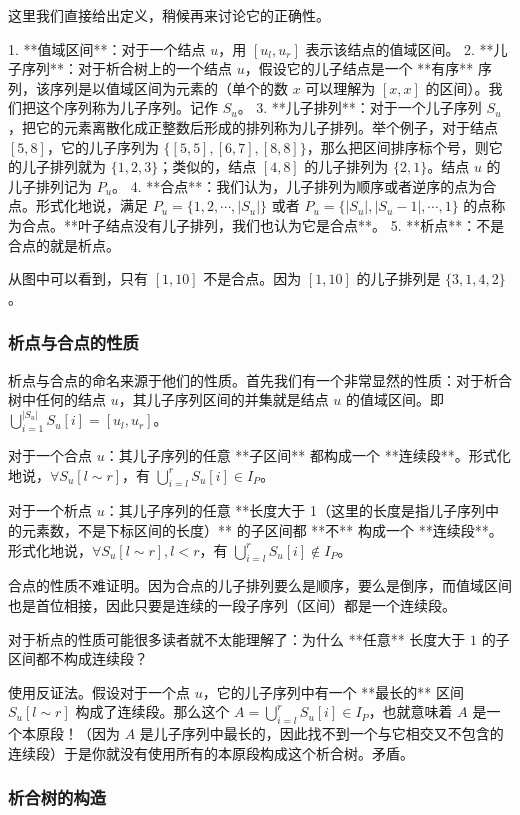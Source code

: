 \documentclass{ctexart}
\begin{document}
这里我们直接给出定义，稍候再来讨论它的正确性。

1. **值域区间**：对于一个结点 $u$，用 $[u_l,u_r]$ 表示该结点的值域区间。
2. **儿子序列**：对于析合树上的一个结点 $u$，假设它的儿子结点是一个 **有序** 序列，该序列是以值域区间为元素的（单个的数 $x$ 可以理解为 $[x,x]$ 的区间）。我们把这个序列称为儿子序列。记作 $S_u$。
3. **儿子排列**：对于一个儿子序列 $S_u$，把它的元素离散化成正整数后形成的排列称为儿子排列。举个例子，对于结点 $[5,8]$，它的儿子序列为 $\{[5,5],[6,7],[8,8]\}$，那么把区间排序标个号，则它的儿子排列就为 $\{1,2,3\}$；类似的，结点 $[4,8]$ 的儿子排列为 $\{2,1\}$。结点 $u$ 的儿子排列记为 $P_u$。
4. **合点**：我们认为，儿子排列为顺序或者逆序的点为合点。形式化地说，满足 $P_u=\{1,2,\cdots,|S_u|\}$ 或者 $P_u=\{|S_u|,|S_u-1|,\cdots,1\}$ 的点称为合点。**叶子结点没有儿子排列，我们也认为它是合点**。
5. **析点**：不是合点的就是析点。

从图中可以看到，只有 $[1,10]$ 不是合点。因为 $[1,10]$ 的儿子排列是 $\{3,1,4,2\}$。

\subsubsection{析点与合点的性质}

析点与合点的命名来源于他们的性质。首先我们有一个非常显然的性质：对于析合树中任何的结点 $u$，其儿子序列区间的并集就是结点 $u$ 的值域区间。即 $\bigcup_{i=1}^{|S_u|}S_u[i]=[u_l,u_r]$。

对于一个合点 $u$：其儿子序列的任意 **子区间** 都构成一个 **连续段**。形式化地说，$\forall S_u[l\sim r]$，有 $\bigcup_{i=l}^rS_u[i]\in I_P$。

对于一个析点 $u$：其儿子序列的任意 **长度大于 1（这里的长度是指儿子序列中的元素数，不是下标区间的长度）** 的子区间都 **不** 构成一个 **连续段**。形式化地说，$\forall S_u[l\sim r],l<r$，有 $\bigcup_{i=l}^rS_u[i]\notin I_P$。

合点的性质不难证明。因为合点的儿子排列要么是顺序，要么是倒序，而值域区间也是首位相接，因此只要是连续的一段子序列（区间）都是一个连续段。

对于析点的性质可能很多读者就不太能理解了：为什么 **任意** 长度大于 $1$ 的子区间都不构成连续段？

使用反证法。假设对于一个点 $u$，它的儿子序列中有一个 **最长的** 区间 $S_u[l\sim r]$ 构成了连续段。那么这个 $A=\bigcup_{i=l}^rS_u[i]\in I_P$，也就意味着 $A$ 是一个本原段！（因为 $A$ 是儿子序列中最长的，因此找不到一个与它相交又不包含的连续段）于是你就没有使用所有的本原段构成这个析合树。矛盾。

\subsubsection{析合树的构造}
\end{document}
